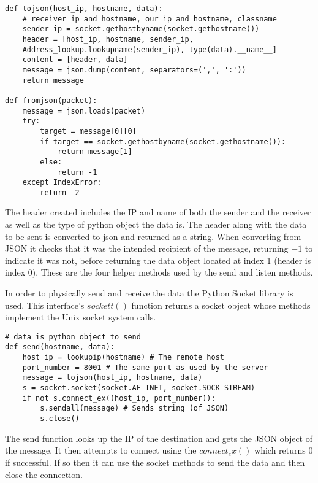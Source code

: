 \begin{lstlisting}
def tojson(host_ip, hostname, data):
    # receiver ip and hostname, our ip and hostname, classname
    sender_ip = socket.gethostbyname(socket.gethostname())
    header = [host_ip, hostname, sender_ip, 
    Address_lookup.lookupname(sender_ip), type(data).__name__]
    content = [header, data]
    message = json.dump(content, separators=(',', ':'))
    return message

def fromjson(packet):
    message = json.loads(packet)
    try:
        target = message[0][0]
        if target == socket.gethostbyname(socket.gethostname()):
            return message[1]
        else:
            return -1
    except IndexError:
        return -2
\end{lstlisting} 
The header created includes the IP and name of both the sender and the 
receiver as well as the type of python object the data is. The header along 
with the data to be sent is converted to json and returned as a string. When  converting from JSON it checks that it was the intended recipient of the 
message, returning $-1$ to indicate it was not, before returning the data 
object located at index 1 (header is index 0). These are the four helper 
methods used by the send and listen methods.

In order to physically send and receive the data the Python Socket library 
is used. This interface's $sockett()$ function returns a socket object whose 
methods implement the Unix socket system calls. 
\begin{lstlisting}
# data is python object to send
def send(hostname, data):
    host_ip = lookupip(hostname) # The remote host
    port_number = 8001 # The same port as used by the server
    message = tojson(host_ip, hostname, data)
    s = socket.socket(socket.AF_INET, socket.SOCK_STREAM)
    if not s.connect_ex((host_ip, port_number)):
        s.sendall(message) # Sends string (of JSON)
        s.close()
\end{lstlisting}
The send function looks up the IP of the destination and gets the JSON object 
of the message. It then attempts to connect using the $connect_ex()$ which 
returns 0 if successful. If so then it can use the socket methods to send the 
data and then close the connection. 

